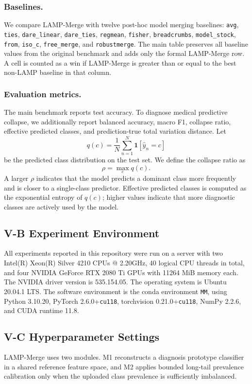\subsubsection{Baselines.}
We compare LAMP-Merge with twelve post-hoc model merging baselines: \texttt{avg}, \texttt{ties}, \texttt{dare\_linear}, \texttt{dare\_ties}, \texttt{regmean}, \texttt{fisher}, \texttt{breadcrumbs}, \texttt{model\_stock}, \texttt{from}, \texttt{iso\_c}, \texttt{free\_merge}, and \texttt{robustmerge}. The main table preserves all baseline values from the original benchmark and adds only the formal LAMP-Merge row. A cell is counted as a win if LAMP-Merge is greater than or equal to the best non-LAMP baseline in that column.

\subsubsection{Evaluation metrics.}
The main benchmark reports test accuracy. To diagnose medical predictive collapse, we additionally report balanced accuracy, macro F1, collapse ratio, effective predicted classes, and prediction-true total variation distance. Let
\[
q(c)=\frac{1}{N}\sum_{n=1}^{N}\mathbf{1}[\hat{y}_{n}=c]
\]
be the predicted class distribution on the test set. We define the collapse ratio as
\[
\rho=\max_c q(c).
\]
A larger $\rho$ indicates that the model predicts a dominant class more frequently and is closer to a single-class predictor. Effective predicted classes is computed as the exponential entropy of $q(c)$; higher values indicate that more diagnostic classes are actively used by the model.

\subsection{V-B Experiment Environment}
All experiments reported in this repository were run on a server with two Intel(R) Xeon(R) Silver 4210 CPUs @ 2.20GHz, 40 logical CPU threads in total, and four NVIDIA GeForce RTX 2080 Ti GPUs with 11264 MiB memory each. The NVIDIA driver version is 535.154.05. The operating system is Ubuntu 20.04.1 LTS. The software environment is the conda environment \texttt{MM}, using Python 3.10.20, PyTorch 2.6.0+\texttt{cu118}, torchvision 0.21.0+\texttt{cu118}, NumPy 2.2.6, and CUDA runtime 11.8.

\subsection{V-C Hyperparameter Settings}
LAMP-Merge uses two modules. M1 reconstructs a diagnosis prototype classifier in a shared reference feature space, and M2 applies bounded long-tail prevalence calibration only when the uploaded class prevalence is sufficiently imbalanced.

